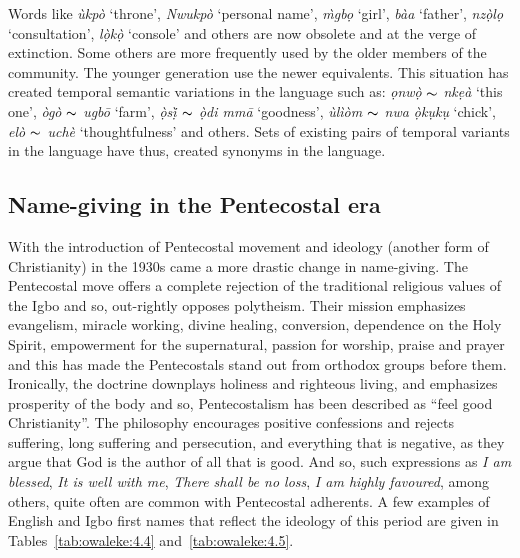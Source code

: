 \documentclass[output=paper]{langscibook}
\begin{document}
Words like \textit{ùkpò} ‘throne’, \textit{Nwukpò} ‘personal name’, \textit{m̀gbọ} ‘girl’, \textit{bàa} ‘father’, \textit{nzọ̀lọ} ‘consultation’, \textit{lọ̀kọ̀} ‘console’ and others are now obsolete and at the verge of extinction. Some others are more frequently used by the older members of the community. The younger generation use the newer equivalents. This situation has created temporal semantic variations in the language such as: \textit{ọnwọ̀} $\thicksim$ \textit{nkẹà} ‘this one’, \textit{ògò} $\thicksim$ \textit{ugbō} ‘farm’, \textit{ọ̀sị̀ $\thicksim$ ọ̀di mmā} ‘goodness’, \textit{ùlìòm $\thicksim$ nwa ọ̀kụkụ} ‘chick’, \textit{elò $\thicksim$ uchè} ‘thoughtfulness’ and others. Sets of existing pairs of temporal variants in the language have thus, created synonyms in the language.  

\subsection{Name-giving in the Pentecostal era}
With the introduction of Pentecostal movement and ideology (another form of Christianity) in the 1930s came a more drastic change in name-giving. The Pentecostal move offers a complete rejection of the traditional religious values of the Igbo and so, out-rightly opposes polytheism. Their mission emphasizes evangelism, miracle working, divine healing, conversion, dependence on the Holy Spirit, empowerment for the supernatural, passion for worship, praise and prayer and this has made the Pentecostals stand out from orthodox groups before them. Ironically, the doctrine downplays holiness and righteous living, and emphasizes prosperity of the body and so, Pentecostalism has been described as ``feel good Christianity''. The philosophy encourages positive confessions and rejects suffering, long suffering and persecution, and everything that is negative, as they argue that God is the author of all that is good. And so, such expressions as \textit{I am blessed}, \textit{It is well with me}, \textit{There shall be no loss}, \textit{I am highly favoured}, among others, quite often are common with Pentecostal adherents. A few examples of English and Igbo first names that reflect the ideology of this period are given in Tables~\ref{tab:owaleke:4.4} and~\ref{tab:owaleke:4.5}.
\end{document}
